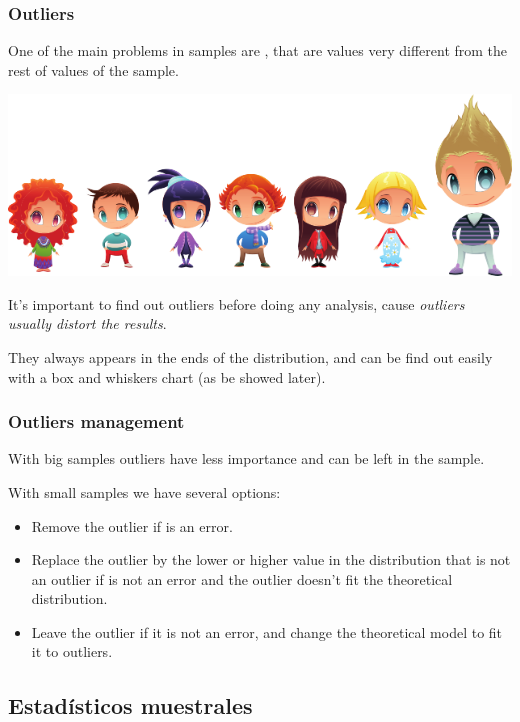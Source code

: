 \begin{frame}
\frametitle{Outliers}
One of the main problems in samples are , that are values very different from the rest of
values of the sample.
\begin{center}
\includegraphics[scale=0.5]{img/descriptive/outlier.png}
\end{center}

It's important to find out outliers before doing any analysis, cause \alert{\emph{outliers usually distort the
results}}.

They always appears in the ends of the distribution, and can be find out easily with a box and whiskers chart (as 
be showed later).
\end{frame}


\begin{frame}
\frametitle{Outliers management}
With big samples outliers have less importance and can be left in the sample.

With small samples we have several options:

\begin{itemize}
\item Remove the outlier if is an error. 
\item Replace the outlier by the lower or higher value in the distribution that is not an outlier if is not an error
and the outlier doesn't fit the theoretical distribution. 
\item Leave the outlier if it is not an error, and change the theoretical model to fit it to outliers.  
\end{itemize}
\end{frame}



\subsection{Estadísticos muestrales}

